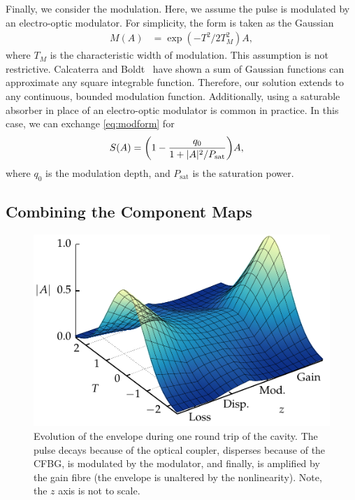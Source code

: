 \documentclass[9pt,twocolumn,twoside]{osajnl}
\let\originalleft\left
\let\originalright\right
\renewcommand{\left}{\mathopen{}\mathclose\bgroup\originalleft}
\renewcommand{\right}{\aftergroup\egroup\originalright}
\begin{document}
Finally, we consider the modulation. Here, we assume the pulse is modulated by an electro-optic modulator. For simplicity, the form is taken as the Gaussian
\begin{align}
	M(A) &= \exp( -T^2 / 2 T_M^2 ) A,
	\label{eq:modform}
\end{align}
where $T_M$ is the characteristic width of modulation. This assumption is not restrictive. Calcaterra and Boldt~\cite{calcaterra2008a} have shown a sum of Gaussian functions can approximate any square integrable function. Therefore, our solution extends to any continuous, bounded modulation function. Additionally, using a saturable absorber in place of an electro-optic modulator is common in practice. In this case, we can exchange \eqref{eq:modform} for~\cite{lapre2019, meng2020, oktem2010, woodward2018}
\begin{align}
	S(A) &= \left( 1 - \frac{q_0}{1 + |A|^2 / P_\text{sat}} \right) A,
\end{align}
where $q_0$ is the modulation depth, and $P_\text{sat}$ is the saturation power.

\subsection{Combining the Component Maps}
\label{sec:effects}

\begin{figure}[tbp]
	\centering
	\includegraphics{Figures/Evo}
	\caption{Evolution of the envelope during one round trip of the cavity. The pulse decays because of the optical coupler, disperses because of the CFBG, is modulated by the modulator, and finally, is amplified by the gain fibre (the envelope is unaltered by the nonlinearity). Note, the $z$ axis is not to scale.}
	\label{fig:cavityevo}
\end{figure}
\end{document}
